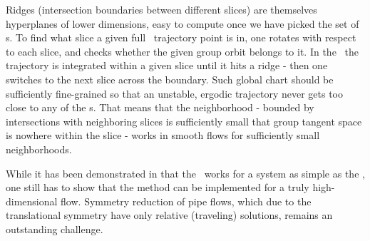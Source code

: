 Ridges (intersection boundaries between different slices) are themselves
hyperplanes of lower dimensions, easy to compute once we have picked
the set of {\template s}. To find what slice a given full \statesp\
trajectory point is in, one rotates with respect to each slice, and
checks whether the given group orbit belongs to it. In the \reducedsp\
the trajectory is integrated within a given slice until it hits a ridge -
then one switches to the next slice across the boundary.
Such global chart should be sufficiently fine-grained so that an unstable,
ergodic trajectory never gets too close to any of the {\sset s}. That
means that the neighborhood - bounded by intersections with neighboring
slices is sufficiently small that group tangent space is nowhere within
the slice - works in smooth flows for sufficiently small neighborhoods.

While it has been demonstrated in \refref{SiCvi10}  that the
\mslices\ works for a system as simple as the \cLf,
one still has to show that the method can be implemented for a
truly high-dimensional flow. Symmetry reduction of pipe flows,
which due to the translational symmetry have only relative (traveling)
solutions, remains an outstanding challenge\rf{ACHKW11}.
